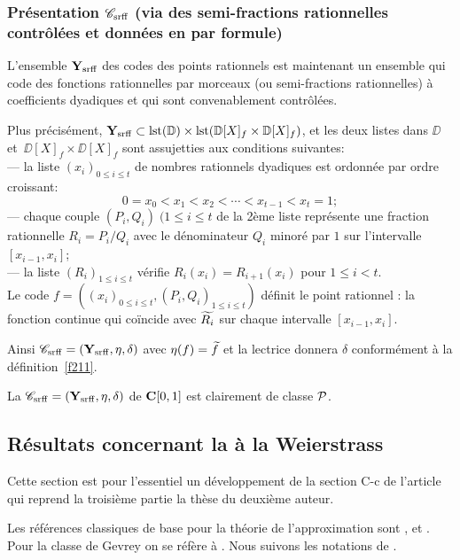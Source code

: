 \subsubsection{Présentation ${{{\mathscr C}}_{\rm srff}}$ (via des semi-fractions rationnelles 
contrôlées et données en \pres par formule)}\label{fsubsubsec513}
L'ensemble  ${{\bf Y}_{\rm srff}}$ des codes des points rationnels  est maintenant un ensemble qui code des fonctions rationnelles par morceaux (ou semi-fractions rationnelles) à coefficients dyadiques et qui sont convenablement contrôlées. 

\smallskip Plus précisément, ${{\bf Y}_{\rm srff}}  \subset {\rm lst}(\mathbb {D}) \times {\rm lst}(\mathbb {D}[X]_f \times \mathbb {D}[X]_f)$,  et les deux listes dans $\DD$ et~$\DD[X]_f \times \DD[X]_f$  sont assujetties aux conditions suivantes:\\
--- la liste  $(x_i)_{0 \leq i \leq t}$ de nombres rationnels dyadiques est 
ordonnée par ordre croissant: 
$$0 = x_0 < x_1 < x_2 <\cdots< x_{t-1} < x_t =1;$$
--- chaque couple   $(P_i,Q_i) \; (1 \leq i \leq t$ de la 2ème liste 
représente une fraction rationnelle  $R_i = P_i/Q_i$    avec le 
dénominateur $Q_i$ minoré par  $1$  sur l'intervalle $[x_{i-1} , x_i]$;\\
--- la liste  $(R_i)_{1 \leq i \leq t}$  vérifie   $R_i(x_i) = R_{i+1}(x_i)$
   pour  $1 \leq i < t$.
\\
Le code  $f = ((x_i)_{0 \leq i \leq t},(P_i,Q_i)_{1 \leq i \leq t})$  
définit le point rationnel : la fonction continue qui coïncide avec $\widetilde{R_i}$  sur chaque intervalle  $[x_{i-1} , x_i]$.

\smallskip Ainsi ${{{\mathscr C}}_{\rm srff}}=({{\bf Y}_{\rm srff}},\eta,\delta)$ avec $\eta(f)=\widetilde f$ et la lectrice donnera $\delta$ conformément à la définition~\ref{f211}.

\smallskip La \pres  ${{{\mathscr C}}_{\rm srff}}=({{\bf Y}_{\rm srff}},\eta,\delta)$  de  ${{\bf C}[0,1]}$  est clairement de classe  ${\cal P}$.

\subsection {Résultats concernant la \pres à la Weierstrass}\label{fsubsec52}

Cette section est pour l'essentiel un développement de la section C-c de l'article \cite{fLo89} qui reprend la troisième partie la thèse du deuxième auteur.

Les références classiques de base pour la théorie de l'approximation sont
\cite[Bakhvalov, 1973]{fBa},
\cite[Cheney, 1966]{fCh} et \cite[Rivlin, 1974]{fRi}. Pour la classe de Gevrey on se réfère à \cite[Hörmander, 1983]{fHo}. Nous suivons les notations de \cite{fCh}.  

